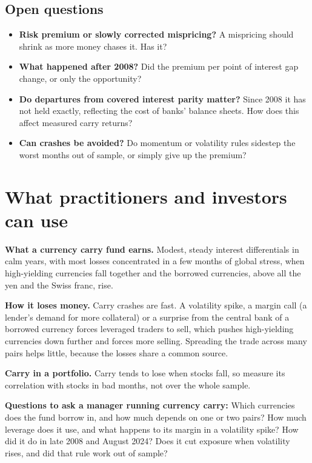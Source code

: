 \subsection{Open questions}
\label{sec:06-open}

\begin{itemize}
  \item \textbf{Risk premium or slowly corrected mispricing?} A mispricing should shrink as more money chases it. Has it?
  \item \textbf{What happened after 2008?} Did the premium per point of interest gap change, or only the opportunity?
  \item \textbf{Do departures from covered interest parity matter?} Since 2008 it has not held exactly, reflecting the cost of banks' balance sheets. How does this affect measured carry returns?
  \item \textbf{Can crashes be avoided?} Do momentum or volatility rules sidestep the worst months out of sample, or simply give up the premium?
\end{itemize}

\section{What practitioners and investors can use}
\label{sec:06-investors}

\textbf{What a currency carry fund earns.} Modest, steady interest differentials in calm years, with most losses concentrated in a few months of global stress, when high-yielding currencies fall together and the borrowed currencies, above all the yen and the Swiss franc, rise.

\textbf{How it loses money.} Carry crashes are fast. A volatility spike, a margin call (a lender's demand for more collateral) or a surprise from the central bank of a borrowed currency forces leveraged traders to sell, which pushes high-yielding currencies down further and forces more selling. Spreading the trade across many pairs helps little, because the losses share a common source.

\textbf{Carry in a portfolio.} Carry tends to lose when stocks fall, so measure its correlation with stocks in bad months, not over the whole sample.

\textbf{Questions to ask a manager running currency carry:} Which currencies does the fund borrow in, and how much depends on one or two pairs? How much leverage does it use, and what happens to its margin in a volatility spike? How did it do in late 2008 and August 2024? Does it cut exposure when volatility rises, and did that rule work out of sample?

